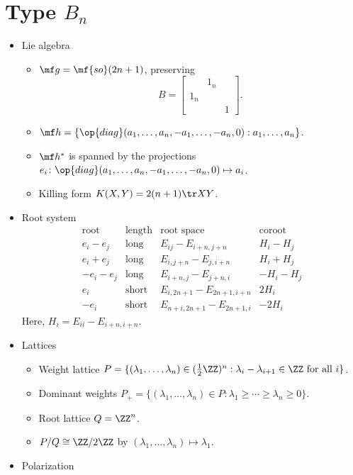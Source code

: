 \documentclass{article}
\begin{document}
\section{Type \texorpdfstring{$B_n$}{ Bn}}
\begin{itemize}
	\item Lie algebra
	\begin{itemize}
		\item $\mf g=\mf{so}(2n+1)$, preserving
		\[B=\begin{bmatrix}
			& 1_n \\ 1_n \\ && 1
		\end{bmatrix}.\]
		\item $\mf h=\{\op{diag}(a_1,\ldots,a_n,-a_1,\ldots,-a_n,0):a_1,\ldots,a_n\}$.
		\item $\mf h^*$ is spanned by the projections $e_i\colon\op{diag}(a_1,\ldots,a_n,-a_1,\ldots,-a_n,0)\mapsto a_i$.
		\item Killing form $K(X,Y)=2(n+1)\tr XY$.\todo{}
	\end{itemize}
	\item Root system
	\[\begin{array}{c|cccccc}
		\text{root} & \text{length} & \text{root space} & \text{coroot}\\\hline
		e_i-e_j & \text{long} & E_{ij}-E_{i+n,j+n} & H_i-H_j\\
		e_i+e_j & \text{long} & E_{i,j+n}-E_{j,i+n} & H_i+H_j\\
		-e_i-e_j & \text{long} & E_{i+n,j}-E_{j+n,i} & -H_i-H_j \\
		e_i & \text{short} & E_{i,2n+1}-E_{2n+1,i+n} & 2H_i \\
		-e_i & \text{short} & E_{n+i,2n+1}-E_{2n+1,i} & -2H_i
	\end{array}\]
	Here, $H_i=E_{ii}-E_{i+n,i+n}$.
	\item Lattices
	\begin{itemize}
		\item Weight lattice $P=\{(\lambda_1,\ldots,\lambda_{n})\in(\frac12\ZZ)^n:\lambda_i-\lambda_{i+1}\in\ZZ\text{ for all }i\}$.
		\item Dominant weights $P_+=\{(\lambda_1,\ldots,\lambda_n)\in P:\lambda_1\ge\cdots\ge\lambda_n\ge0\}$.
		\item Root lattice $Q=\ZZ^n$.
		\item $P/Q\cong\ZZ/2\ZZ$ by $(\lambda_1,\ldots,\lambda_n)\mapsto\lambda_1$.
	\end{itemize}
	\item Polarization

\end{itemize}
\end{document}
